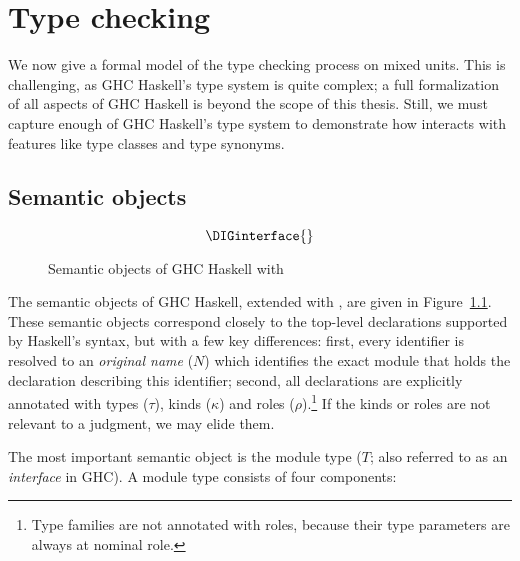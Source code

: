 \chapter{Type checking}
\label{sec:compiler}

We now give a formal model of the type checking process on mixed
units.  This is challenging, as GHC Haskell's type system is quite
complex; a full formalization of all aspects of GHC Haskell is
beyond the scope of this thesis.  Still, we must capture enough
of GHC Haskell's type system to demonstrate how \Backpack{}
interacts with features like type classes and type synonyms.


\section{Semantic objects}
\label{sec:semantic-objects}

\begin{figure}
\[ \DIGinterface{} \]
\caption{Semantic objects of GHC Haskell with \Backpack{}}
\label{fig:semantic-objects}
\end{figure}

The semantic objects of GHC Haskell, extended with \Backpack{}, are
given in Figure~\ref{fig:semantic-objects}.  These semantic objects
correspond closely to the top-level declarations supported by
Haskell's syntax, but with a few key differences: first, every
identifier is resolved to an \emph{original name} ($N$) which identifies
the exact module that holds the declaration describing this identifier;
second, all declarations are explicitly annotated with types ($\tau$), kinds ($\kappa$) and
roles ($\rho$).\footnote{Type families are not annotated with roles, because their
type parameters are always at nominal role.}  If the kinds or roles are not
relevant to a judgment, we may elide them.

The most important semantic object is the module type ($T$; also referred
to as an \emph{interface} in GHC).  A module
type consists of four components:

